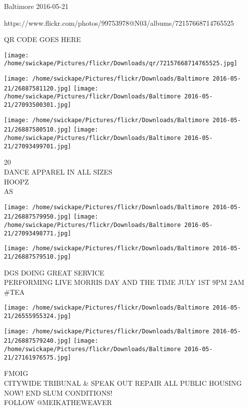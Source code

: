 \documentclass[10pt,letterpaper]{article}
\begin{document}
Baltimore 2016-05-21

https://www.flickr.com/photos/99753978@N03/albums/72157668714765525

QR CODE GOES HERE

\texttt{[image: /home/swickape/Pictures/flickr/Downloads/qr/72157668714765525.jpg]}
\pagebreak

\texttt{[image: /home/swickape/Pictures/flickr/Downloads/Baltimore 2016-05-21/26887581120.jpg]}
\texttt{[image: /home/swickape/Pictures/flickr/Downloads/Baltimore 2016-05-21/27093500301.jpg]}

\texttt{[image: /home/swickape/Pictures/flickr/Downloads/Baltimore 2016-05-21/26887580510.jpg]}
\texttt{[image: /home/swickape/Pictures/flickr/Downloads/Baltimore 2016-05-21/27093499701.jpg]}

20\\
DANCE APPAREL IN ALL SIZES\\
HOOPZ\\
AS\\
\pagebreak

\texttt{[image: /home/swickape/Pictures/flickr/Downloads/Baltimore 2016-05-21/26887579950.jpg]}
\texttt{[image: /home/swickape/Pictures/flickr/Downloads/Baltimore 2016-05-21/27093498771.jpg]}

\vspace{0.25in}
\texttt{[image: /home/swickape/Pictures/flickr/Downloads/Baltimore 2016-05-21/26887579510.jpg]}

DGS DOING GREAT SERVICE\\
PERFORMING LIVE MORRIS DAY AND THE TIME JULY 1ST 9PM 2AM\\
\#TEA\\
\pagebreak

\texttt{[image: /home/swickape/Pictures/flickr/Downloads/Baltimore 2016-05-21/26555955324.jpg]}

\vspace{0.25in}
\texttt{[image: /home/swickape/Pictures/flickr/Downloads/Baltimore 2016-05-21/26887579240.jpg]}
\texttt{[image: /home/swickape/Pictures/flickr/Downloads/Baltimore 2016-05-21/27161976575.jpg]}

FMOIG\\
CITYWIDE TRIBUNAL \& SPEAK OUT REPAIR ALL PUBLIC HOUSING NOW!  END SLUM CONDITIONS!\\
FOLLOW @MEIKATHEWEAVER\\
\pagebreak
\end{document}
